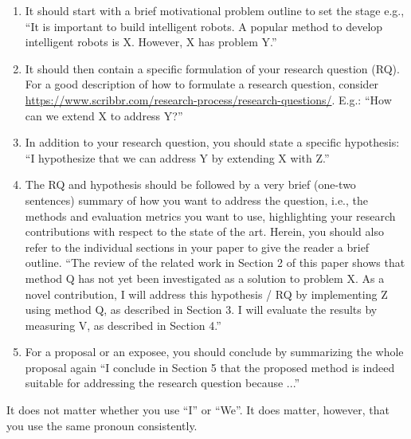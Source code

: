 \documentclass[12pt]{article}
\theoremstyle{plain}
\theoremstyle{definition}
\theoremstyle{remark}
\begin{document}
\begin{enumerate}
\item It should start with a brief motivational problem outline to set the stage e.g., ``It is important to build intelligent robots. A popular method to develop intelligent robots is X. However, X has problem Y.''

\item It should then contain a specific formulation of your research question (RQ). For a good description of how to formulate a research question, consider \url{https://www.scribbr.com/research-process/research-questions/}. E.g.: ``How can we extend X to address Y?''

\item In addition to your research question, you should state a specific hypothesis: 
``I hypothesize that we can address Y by extending X with Z.''

\item The RQ and hypothesis should be followed by a very brief (one-two sentences) summary of how you want to address the question, i.e., the methods and evaluation metrics you want to use, highlighting your research contributions with respect to the state of the art. 
Herein, you should also refer to the individual sections in your paper to give the reader a brief outline. 
``The review of the related work in Section 2 of this paper shows that method Q has not yet been investigated as a solution to problem X. As a novel contribution, I will address this hypothesis / RQ by implementing Z using method Q, as described in Section 3. I will evaluate the results by measuring V, as described in Section 4.'' 

\item For a proposal or an exposee, you should conclude by summarizing the whole proposal again ``I conclude in Section 5 that the proposed method is indeed suitable for addressing the research question because ...''

\end{enumerate}
It does not matter whether you use ``I'' or ``We''. It does matter, however, that you use the same pronoun consistently.


\end{document}
